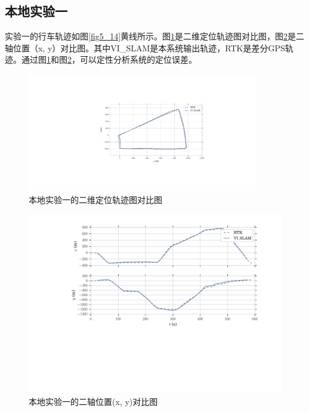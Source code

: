\subsection{本地实验一}
实验一的行车轨迹如图\ref{fig5_14}黄线所示。图\ref{fig5_15}是二维定位轨迹图对比图，图\ref{fig5_16}是二轴位置（x, y）对比图。其中VI\_SLAM是本系统输出轨迹，RTK是差分GPS轨迹。通过图\ref{fig5_15}和图\ref{fig5_16}，可以定性分析系统的定位误差。
\begin{figure}[h]\setlength{\belowcaptionskip}{-12pt}
	\centering
	\includegraphics[width=0.90\textwidth]{figures/chapter5/traject_3km}
	\caption{本地实验一的二维定位轨迹图对比图}\label{fig5_15}
\end{figure}
\begin{figure}[h]\setlength{\belowcaptionskip}{-12pt}
	\centering
	\includegraphics[width=1.0\textwidth]{figures/chapter5/xy_3km}
	\caption{本地实验一的二轴位置(x, y)对比图}\label{fig5_16}
\end{figure} 


